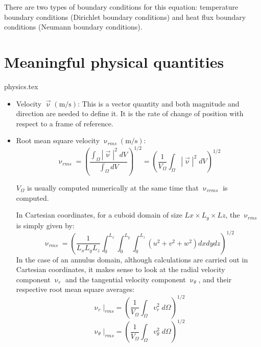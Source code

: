 There are two types of boundary conditions for this equation: temperature boundary conditions (Dirichlet boundary conditions) and heat flux boundary conditions (Neumann boundary conditions). 

\newpage
\section{Meaningful physical quantities}
\begin{flushright} {\tiny {\color{gray} physics.tex}} \end{flushright}

\begin{itemize}
\item {\color{violet} Velocity} $\vec \upnu (\text{m/s})$: This is a vector quantity and both magnitude and direction are needed to define it. It is the rate of change of position with respect to a frame of reference.
\item {\color{violet} Root mean square velocity} $\upnu_{rms} (\text{m/s})$: 
\begin{equation}
\upnu_{rms} = \left ( \frac{\int_\Omega |{\vec \upnu}|^2 \;  dV}{\int_\Omega dV }  \right )^{1/2}
=\left ( \frac{1}{V_\Omega} \int_\Omega |{\vec \upnu}|^2 \;  dV \right )^{1/2} \label{eqVrms}
\end{equation}
\begin{remark}
$V_\Omega$ is usually computed numerically at the same time that $\upnu_{vrms}$ is computed.
\end{remark}
In Cartesian coordinates, for a cuboid domain of size $Lx\times L_y \times Lz$, 
the $\upnu_{rms}$ is simply given by:
\begin{equation}
\upnu_{rms}  = \left ( \frac{1}{L_xL_yL_z} \int_0^{L_x}\int_0^{L_y}\int_0^{L_z} 
(u^2 + v^2 + w^2) dxdydz  \right )^{1/2}
\end{equation}
In the case of an annulus domain, although calculations are carried out 
in Cartesian coordinates, it makes sense
to look at the radial velocity component $\upnu_r$ and the tangential velocity 
component $\upnu_\theta$, and their respective
root mean square averages:
\begin{equation}
\upnu_r|_{rms}  =\left ( \frac{1}{V_\Omega} \int_\Omega v_r^2 \;  d \Omega \right )^{1/2} \label{eqVrVrms}
\end{equation}
\begin{equation}
\upnu_\theta|_{rms}  = \left ( \frac{1}{V_\Omega} \int_\Omega v_\theta^2 \;  d \Omega \right )^{1/2} \label{eqThetaVrms}
\end{equation}



\end{itemize}
